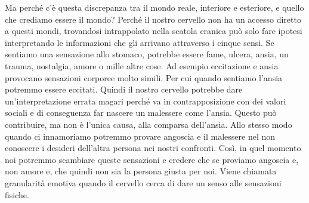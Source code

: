 \documentclass[12pt]{book} %
\begin{document}
Ma perché c'è questa discrepanza tra il mondo reale, interiore e esteriore, e quello che crediamo
essere il mondo? Perché il nostro cervello non ha un accesso diretto a questi mondi, trovandosi intrappolato nella
scatola cranica può solo fare ipotesi interpretando le informazioni che gli arrivano attraverso i cinque sensi. 
Se sentiamo una sensazione allo stomaco,
potrebbe essere fame, ulcera, ansia, un trauma, nostalgia, amore o mille altre cose. Ad esempio eccitazione e ansia
provocano sensazioni corporee molto simili. Per cui quando sentiamo l'ansia potremmo essere
eccitati. Quindi il nostro cervello potrebbe dare un'interpretazione errata magari perché va in contrapposizione con
dei valori sociali e di conseguenza far nascere un malessere come l'ansia. Questo può contribuire, ma non è l’unica causa, alla comparsa dell’ansia. Allo stesso modo quando ci innamoriamo
potremmo provare angoscia e il malessere nel non conoscere i desideri dell'altra persona nei nostri confronti. 
Così, in quel momento noi potremmo scambiare queste sensazioni e credere che se proviamo angoscia e, non amore e, che quindi non sia la persona giusta per noi. Viene chiamata granularità emotiva quando il cervello cerca di dare un senso alle sensazioni 
fisiche. 
\end{document}
